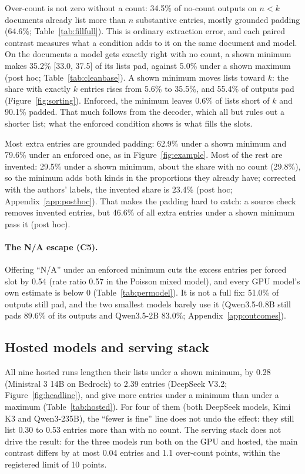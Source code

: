 Over-count is not zero without a count: 34.5\% of no-count outputs on $n < k$ documents already list more than $n$ substantive entries, mostly grounded padding (64.6\%\pre{}; Table~\ref{tab:fillfull}).
This is ordinary extraction error, and each paired contrast measures what a condition adds to it on the same document and model.
On the documents a model gets exactly right with no count, a shown minimum makes 35.2\% [33.0, 37.5] of its lists pad, against 5.0\% under a shown maximum (post hoc; Table~\ref{tab:cleanbase}).
A shown minimum moves lists toward $k$: the share with exactly $k$ entries rises from 5.6\% to 35.5\%, and 55.4\% of outputs pad (Figure~\ref{fig:sorting}).
Enforced, the minimum leaves 0.6\% of lists short of $k$ and 90.1\% padded.
That much follows from the decoder, which all but rules out a shorter list; what the enforced condition shows is what fills the slots.

Most extra entries are grounded padding: 62.9\%\pre{} under a shown minimum and 79.6\%\pre{} under an enforced one, as in Figure~\ref{fig:example}.
Most of the rest are invented: 29.5\%\pre{} under a shown minimum, about the share with no count (29.8\%\pre{}), so the minimum adds both kinds in the proportions they already have; corrected with the authors' labels, the invented share is 23.4\% (post hoc; Appendix~\ref{app:posthoc}).
That makes the padding hard to catch: a source check removes invented entries, but 46.6\%\pre{} of all extra entries under a shown minimum pass it (post hoc).

\paragraph{The N/A escape (C5).}
Offering ``N/A'' under an enforced minimum cuts the excess entries per forced slot by 0.54 (rate ratio 0.57 in the Poisson mixed model), and every GPU model's own estimate is below 0 (Table~\ref{tab:permodel}).
It is not a full fix: 51.0\% of outputs still pad, and the two smallest models barely use it (Qwen3.5-0.8B still pads 89.6\% of its outputs and Qwen3.5-2B 83.0\%; Appendix~\ref{app:outcomes}).

\subsection{Hosted models and serving stack}
\label{sec:hosted}

All nine hosted runs lengthen their lists under a shown minimum, by 0.28 (Ministral 3 14B on Bedrock) to 2.39 entries (DeepSeek V3.2; Figure~\ref{fig:headline}), and give more entries under a minimum than under a maximum (Table~\ref{tab:hosted}).
For four of them (both DeepSeek models, Kimi K3 and Qwen3-235B), the ``fewer is fine'' line does not undo the effect: they still list 0.30 to 0.53 entries more than with no count.
The serving stack does not drive the result: for the three models run both on the GPU and hosted, the main contrast differs by at most 0.04 entries and 1.1 over-count points, within the registered limit of 10 points.

